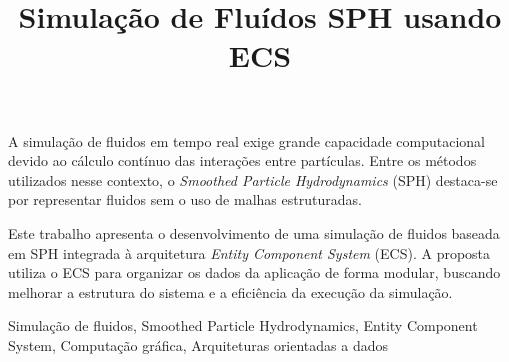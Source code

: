 \documentclass[10pt,conference,twocolumn]{style}
\begin{document}
\title{Simulação de Fluídos SPH usando ECS}
\author{
}

\maketitle

\begin{resumo}

A simulação de fluidos em tempo real exige grande capacidade computacional
  devido ao cálculo contínuo das interações entre partículas. Entre os métodos
  utilizados nesse contexto, o \textit{Smoothed Particle Hydrodynamics} (SPH)
  destaca-se por representar fluidos sem o uso de malhas estruturadas.

  Este trabalho apresenta o desenvolvimento de uma simulação de fluidos baseada
  em SPH integrada à arquitetura \textit{Entity Component System} (ECS). A
  proposta utiliza o ECS para organizar os dados da aplicação de forma modular,
  buscando melhorar a estrutura do sistema e a eficiência da execução da
  simulação.
\end{resumo}

\begin{palavraschave}

Simulação de fluidos, Smoothed Particle Hydrodynamics, Entity Component System,
  Computação gráfica, Arquiteturas orientadas a dados
\end{palavraschave}

\IEEEpeerreviewmaketitle

\setlength{\textfloatsep}{0pt}  %
\setlength{\intextsep}{0pt}     %
\setlength{\floatsep}{0pt}      %






\setlength{\bibitemsep}{10pt}
\clearpage
\onecolumn
\printbibliography
\end{document}
